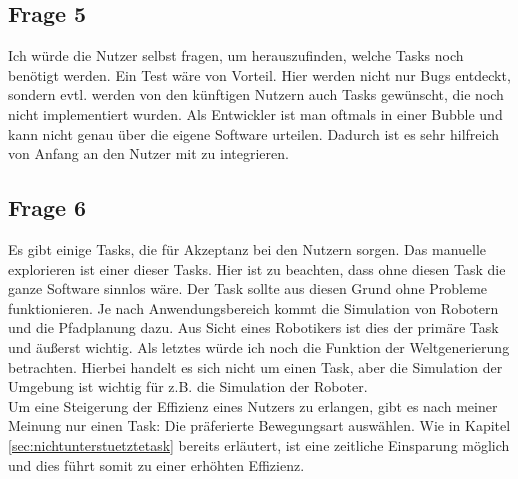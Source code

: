 \documentclass{TUBAFarbeiten}
\begin{document}
\subsection{Frage 5}
Ich würde die Nutzer selbst fragen, um herauszufinden, welche Tasks noch benötigt werden. Ein Test wäre von Vorteil. Hier werden nicht nur Bugs entdeckt, sondern evtl. werden von den künftigen Nutzern auch Tasks gewünscht, die noch nicht implementiert wurden. Als Entwickler ist man oftmals in einer Bubble und kann nicht genau über die eigene Software urteilen. Dadurch ist es sehr hilfreich von Anfang an den Nutzer mit zu integrieren.
\subsection{Frage 6}
Es gibt einige Tasks, die für Akzeptanz bei den Nutzern sorgen. Das manuelle explorieren ist einer dieser Tasks. Hier ist zu beachten, dass ohne diesen Task die ganze Software sinnlos wäre. Der Task sollte aus diesen Grund ohne Probleme funktionieren. Je nach Anwendungsbereich kommt die Simulation von Robotern und die Pfadplanung dazu. Aus Sicht eines Robotikers ist dies der primäre Task und äußerst wichtig. Als letztes würde ich noch die Funktion der Weltgenerierung betrachten. Hierbei handelt es sich nicht um einen Task, aber die Simulation der Umgebung ist wichtig für z.B. die Simulation der Roboter.\\
Um eine Steigerung der Effizienz eines Nutzers zu erlangen, gibt es nach meiner Meinung nur einen Task: Die präferierte Bewegungsart auswählen. Wie in Kapitel \ref{sec:nichtunterstuetztetask} bereits erläutert, ist eine zeitliche Einsparung möglich und dies führt somit zu einer erhöhten Effizienz.


\newpage
\listoffigures
\newpage
\listoftables
\newpage


\end{document}
